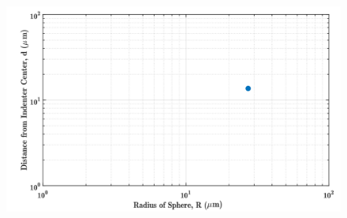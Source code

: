 \begin{figure}
	\centering
	\includegraphics[width=\linewidth]{Chapters/Figures/sphere011_ia/single_d_vs_r}
	\caption[D vs R plot]{}
	\label{fig:singledvsr}
\end{figure}
